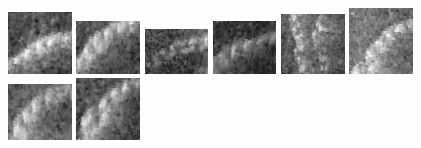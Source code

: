 \begin{figure}
    \includegraphics[width=0.15\textwidth]{chapters/images/dataset/all-class-images/chain/chain-176.jpg}
    \includegraphics[width=0.15\textwidth]{chapters/images/dataset/all-class-images/chain/chain-119.jpg}
    \includegraphics[width=0.15\textwidth]{chapters/images/dataset/all-class-images/chain/chain-188.jpg}
    \includegraphics[width=0.15\textwidth]{chapters/images/dataset/all-class-images/chain/chain-108.jpg}
    \includegraphics[width=0.15\textwidth]{chapters/images/dataset/all-class-images/chain/chain-72.jpg}
    \includegraphics[width=0.15\textwidth]{chapters/images/dataset/all-class-images/chain/chain-88.jpg}    
    \includegraphics[width=0.15\textwidth]{chapters/images/dataset/all-class-images/chain/chain-216.jpg}
    \includegraphics[width=0.15\textwidth]{chapters/images/dataset/all-class-images/chain/chain-123.jpg} 
       

\end{figure}

